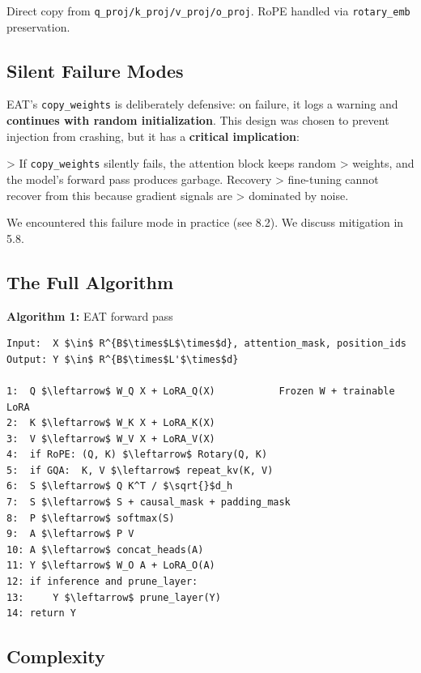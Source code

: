 Direct copy from \texttt{q\_proj/k\_proj/v\_proj/o\_proj}. RoPE handled via \texttt{rotary\_emb} 
preservation.

\subsection{Silent Failure Modes}

EAT's \texttt{copy\_weights} is deliberately defensive: on failure, it logs a 
warning and \textbf{continues with random initialization}. This design was chosen 
to prevent injection from crashing, but it has a \textbf{critical implication}:

> If \texttt{copy\_weights} silently fails, the attention block keeps random 
> weights, and the model's forward pass produces garbage. Recovery 
> fine-tuning cannot recover from this because gradient signals are 
> dominated by noise.

We encountered this failure mode in practice (see  8.2). We discuss 
mitigation in  5.8.

\subsection{The Full Algorithm}

\textbf{Algorithm 1:} EAT forward pass
\begin{lstlisting}
Input:  X $\in$ R^{B$\times$L$\times$d}, attention_mask, position_ids
Output: Y $\in$ R^{B$\times$L'$\times$d}

1:  Q $\leftarrow$ W_Q X + LoRA_Q(X)           Frozen W + trainable LoRA
2:  K $\leftarrow$ W_K X + LoRA_K(X)
3:  V $\leftarrow$ W_V X + LoRA_V(X)
4:  if RoPE: (Q, K) $\leftarrow$ Rotary(Q, K)
5:  if GQA:  K, V $\leftarrow$ repeat_kv(K, V)
6:  S $\leftarrow$ Q K^T / $\sqrt{}$d_h
7:  S $\leftarrow$ S + causal_mask + padding_mask
8:  P $\leftarrow$ softmax(S)
9:  A $\leftarrow$ P V
10: A $\leftarrow$ concat_heads(A)
11: Y $\leftarrow$ W_O A + LoRA_O(A)
12: if inference and prune_layer:
13:     Y $\leftarrow$ prune_layer(Y)
14: return Y
\end{lstlisting}

\subsection{Complexity}

